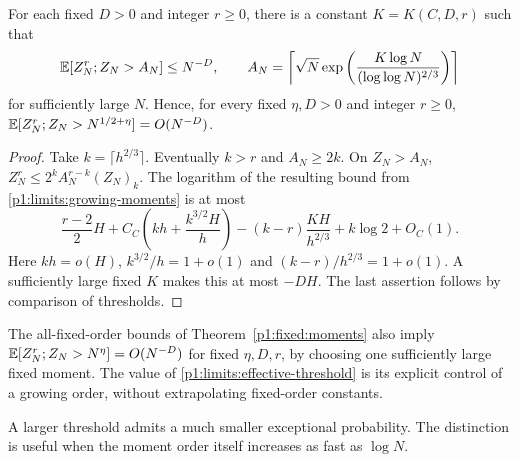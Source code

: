 \begin{proposition}
\label{p1:limits:effective-tail}
For each fixed $D>0$ and integer $r\ge0$, there is a constant
$K=K(C,D,r)$ such that
\begin{equation}
 \mathbb E[Z_N^r;Z_N>A_N]\le N^{-D},\qquad
 A_N=\left\lceil\sqrt N\exp\left(\frac{K\log N}
                                    {(\log\log N)^{2/3}}\right)\right\rceil
 \label{p1:limits:effective-threshold}
\end{equation}
for sufficiently large $N$.  Hence, for every fixed
$\eta,D>0$ and integer $r\ge0$,
$\mathbb E[Z_N^r;Z_N>N^{1/2+\eta}]=O(N^{-D})$.
\end{proposition}
\begin{proof}
Take $k=\lceil h^{2/3}\rceil$.  Eventually $k>r$ and
$A_N\ge2k$.  On $Z_N>A_N$,
$Z_N^r\le2^kA_N^{r-k}(Z_N)_k$.
The logarithm of the resulting bound from
\eqref{p1:limits:growing-moments} is at most
\[
 \frac{r-2}{2}H+C_C\left(kh+\frac{k^{3/2}H}{h}\right)
        -(k-r)\frac{KH}{h^{2/3}}+k\log2+O_C(1).
\]
Here $kh=o(H)$, $k^{3/2}/h=1+o(1)$ and
$(k-r)/h^{2/3}=1+o(1)$.  A sufficiently large fixed $K$
makes this at most $-DH$.  The last assertion follows by
comparison of thresholds.
\end{proof}

The all-fixed-order bounds of Theorem~\ref{p1:fixed:moments}
also imply $\mathbb E[Z_N^r;Z_N>N^\eta]=O(N^{-D})$ for fixed
$\eta,D,r$, by choosing one sufficiently large fixed moment.
The value of \eqref{p1:limits:effective-threshold} is its explicit
control of a growing order, without extrapolating fixed-order
constants.

A larger threshold admits a much smaller exceptional probability.
The distinction is useful when the moment order itself increases
as fast as $\log N$.

